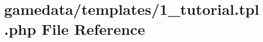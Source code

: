 \hypertarget{1__tutorial_8tpl_8php}{\section{gamedata/templates/1\+\_\+tutorial.tpl.\+php File Reference}
\label{1__tutorial_8tpl_8php}
}
